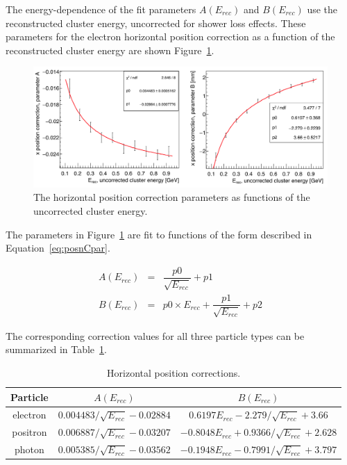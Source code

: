 The energy-dependence of the fit parameters $A(E_{rec})$ and $B(E_{rec})$ use the reconstructed cluster energy, uncorrected for shower loss effects. These parameters for the electron horizontal position correction as a function of the reconstructed cluster energy are shown Figure~\ref{Figure:xposcorrPar}.

\begin{figure}[H]
  \centering
      \includegraphics[width=1.0\textwidth]{pics/performance/xposcorrPar.png}
  \caption[Horizontal position correction dependence for electrons]{The horizontal position correction parameters as functions of the uncorrected cluster energy.}
  \label{Figure:xposcorrPar}
\end{figure}

The parameters in Figure~\ref{Figure:xposcorrPar} are fit to functions of the form described in Equation~\eqref{eq:posnCpar}.

\begin{eqnarray*}
\label{eq:posnCpar}
A(E_{rec}) & = & \dfrac{p0}{\sqrt{E_{rec}}}+p1\\
B(E_{rec}) & = & p0\times E_{rec} +\dfrac{p1}{\sqrt{E_{rec}}}+p2
\end{eqnarray*}

The corresponding correction values for all three particle types can be summarized in Table~\ref{tab:horizPosCorr}.

\begin{table}[H]
\caption{Horizontal position corrections.}
\label{tab:horizPosCorr}
\centering
\begin{tabular}{|c|c|c|}
\toprule
Particle & $A(E_{rec})$ & $B(E_{rec})$ \\
\midrule
electron & $0.004483/\sqrt{E_{rec}}-0.02884$ & $0.6197E_{rec}-2.279/\sqrt{E_{rec}}+3.66$ \\
positron & $0.006887/\sqrt{E_{rec}}-0.03207$ & $-0.8048E_{rec}+0.9366/\sqrt{E_{rec}}+2.628$ \\
photon & $0.005385/\sqrt{E_{rec}}-0.03562$ & $-0.1948E_{rec}-0.7991/\sqrt{E_{rec}}+3.797$ \\
\bottomrule
\end{tabular}
\end{table}

